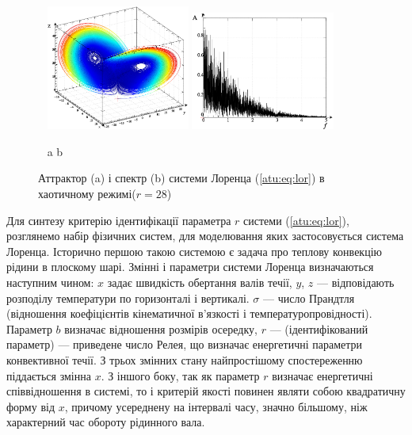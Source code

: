 \documentclass[a4paper,13pt]{atuaref}
\begin{document}
\begin{figure}[ht!]
\begin{center}
  ~ \hfill
  \includegraphics[width=0.42\textwidth]{p5/p/cha/lor/lor0-p_xyz_r=028_xl.png}
  \hfill
  \includegraphics[width=0.42\textwidth]{p5/p/cha/lor/lor0_fft-p_f_r=028_xl.png}
  \hfill ~
\end{center}
\vspace{-2.5ex}
  \begin{center}
    ~ \hfill a \hfill\hfill b \hfill ~
  \end{center}
  \vspace{-2.5ex}
  \caption{Аттрактор (a) і спектр (b) системи Лоренца (\ref{atu:eq:lor}) в хаотичному режимі($r=28$)}
\label{atu:f:lor_attractor_phase_chaos28}
\end{figure}

Для синтезу критерію ідентифікації параметра $r$ системи
(\ref{atu:eq:lor}), розглянемо набір фізичних систем, для моделювання яких застосовується
система Лоренца. Історично першою такою системою є задача про теплову
конвекцію рідини в плоскому шарі.
Змінні і параметри системи Лоренца визначаються наступним чином: $x$ задає
швидкість обертання валів течії, $y$, $z$ --- відповідають розподілу
температури по горизонталі і вертикалі. $\sigma$ --- число Прандтля
(відношення коефіцієнтів кінематичної в'язкості і температуропровідності).
Параметр $b$ визначає відношення розмірів осередку, $r$ --- (ідентифікований
параметр) --- приведене число Релея, що визначає енергетичні параметри
конвективної течії.
З трьох змінних стану найпростішому спостереженню піддається змінна $x$.
З іншого боку, так як параметр $r$ визначає енергетичні співвідношення в
системі, то і критерій якості повинен являти собою квадратичну форму від $x$,
причому усереднену на інтервалі часу, значно більшому, ніж характерний час
обороту рідинного вала.
\end{document}
